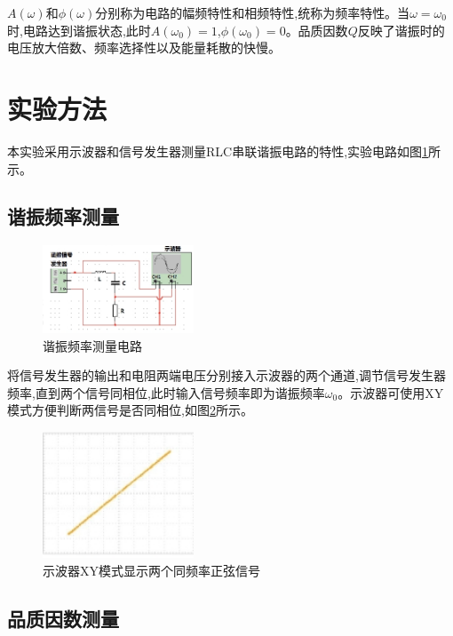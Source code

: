 \documentclass[UTF8]{ctexart}
\begin{document}
$A(\omega)$和$\phi(\omega)$分别称为电路的幅频特性和相频特性,统称为频率特性。当$\omega=\omega_0$时,电路达到谐振状态,此时$A(\omega_0)=1$,$\phi(\omega_0)=0$。品质因数$Q$反映了谐振时的电压放大倍数、频率选择性以及能量耗散的快慢。

\section{实验方法}

本实验采用示波器和信号发生器测量RLC串联谐振电路的特性,实验电路如图\ref{fig:measure_circuit}所示。

\subsection{谐振频率测量}

\begin{figure}[htbp]
\centering
\includegraphics[width=0.4\textwidth]{measure_circuit.png}
\caption{谐振频率测量电路}\label{fig:measure_circuit}
\end{figure}

将信号发生器的输出和电阻两端电压分别接入示波器的两个通道,调节信号发生器频率,直到两个信号同相位,此时输入信号频率即为谐振频率$\omega_0$。示波器可使用XY模式方便判断两信号是否同相位,如图\ref{fig:xy_mode}所示。

\begin{figure}[htbp]
\centering
\includegraphics[width=0.4\textwidth]{xy_mode.png}
\caption{示波器XY模式显示两个同频率正弦信号}\label{fig:xy_mode}
\end{figure}

\subsection{品质因数测量}
\end{document}
